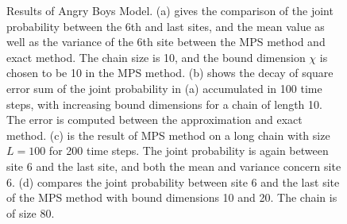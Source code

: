 \documentclass[english]{article}[12pt]
\begin{document}
\begin{figure}[H]
  \caption{Results of Angry Boys Model. (a) gives the comparison of the joint probability between the 6th and last sites, and the mean value as well as the variance of the 6th site between the MPS method and exact method. The chain size is 10, and the bound dimension $\chi$ is chosen to be 10 in the MPS method. (b) shows the decay of square error sum of the joint probability in (a) accumulated in 100 time steps, with increasing bound dimensions for a chain of length 10. The error is computed between the approximation and exact method. (c) is the result of MPS method on a long chain with size $L=100$ for 200 time steps. The joint probability is again between site 6 and the last site, and both the mean and variance concern site 6. (d) compares the joint probability between site 6 and the last site of the MPS method with bound dimensions 10 and 20. The chain is of size 80.}
  \label{fig:Angry_result}
\end{figure}
\end{document}
